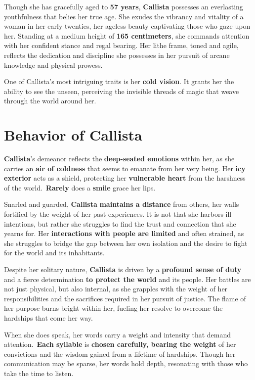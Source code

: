 \documentclass{article}
\begin{document}
Though she has gracefully aged to \textbf{57 years}, \textbf{Callista} possesses an everlasting youthfulness that belies her true age. She exudes the vibrancy and vitality of a woman in her early twenties, her ageless beauty captivating those who gaze upon her. Standing at a medium height of \textbf{165 centimeters}, she commands attention with her confident stance and regal bearing. Her lithe frame, toned and agile, reflects the dedication and discipline she possesses in her pursuit of arcane knowledge and physical prowess.

One of Callista's most intriguing traits is her \textbf{cold vision}. It grants her the ability to see the unseen, perceiving the invisible threads of magic that weave through the world around her.

\section{Behavior of Callista}

\textbf{Callista}'s demeanor reflects the \textbf{deep-seated emotions} within her, as she carries an \textbf{air of coldness} that seems to emanate from her very being. Her \textbf{icy exterior} acts as a shield, protecting her \textbf{vulnerable heart} from the harshness of the world.\ \textbf{Rarely} does a \textbf{smile} grace her lips.

Snarled and guarded, \textbf{Callista} \textbf{maintains a distance} from others, her walls fortified by the weight of her past experiences. It is not that she harbors ill intentions, but rather she struggles to find the trust and connection that she yearns for. Her \textbf{interactions with people are limited} and often strained, as she struggles to bridge the gap between her own isolation and the desire to fight for the world and its inhabitants.

Despite her solitary nature, \textbf{Callista} is driven by a \textbf{profound sense of duty} and a fierce determination \textbf{to protect the world} and its people. Her battles are not just physical, but also internal, as she grapples with the weight of her responsibilities and the sacrifices required in her pursuit of justice. The flame of her purpose burns bright within her, fueling her resolve to overcome the hardships that come her way.

When she does speak, her words carry a weight and intensity that demand attention.\ \textbf{Each syllable} is \textbf{chosen carefully, bearing the weight} of her convictions and the wisdom gained from a lifetime of hardships. Though her communication may be sparse, her words hold depth, resonating with those who take the time to listen.
\end{document}
